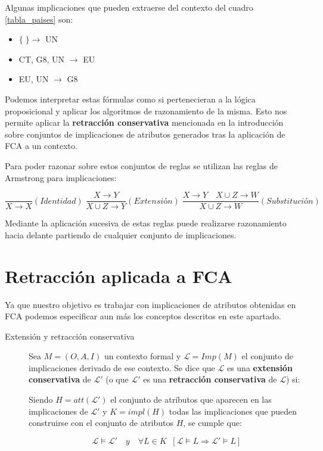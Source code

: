 	Algunas implicaciones que pueden extraerse del contexto del cuadro \ref{tabla_paises} son:
	
	\begin{itemize}
		\item $\{\;\} \rightarrow$ UN
		\item CT, G8, UN $\rightarrow$ EU
		\item EU, UN $\rightarrow$ G8 
	\end{itemize}

	 Podemos interpretar estas fórmulas como si pertenecieran a la lógica proposicional y aplicar los algoritmos de razonamiento de la misma. Esto nos permite aplicar la \textbf{retracción conservativa} mencionada en la introducción sobre conjuntos de implicaciones de atributos generados tras la aplicación de FCA a un contexto.
	 
	 Para poder razonar sobre estos conjuntos de reglas se utilizan las reglas de Armstrong  para implicaciones: 
	 
	 \[
	 	\frac{}{X \to X} (Identidad) \; \frac{X \to Y}{X \cup Z \to Y}(Extensión) \; \frac{X \to Y \quad X \cup Z \to W}{X \cup Z \to W}(Substitución)
	 \]
	
	Mediante la aplicación sucesiva de estas reglas puede realizarse razonamiento hacia delante partiendo de cualquier conjunto de implicaciones.
	
\section*{Retracción aplicada a FCA} 	

Ya que nuestro objetivo es trabajar con implicaciones de atributos obtenidas en FCA podemos especificar aun más los conceptos descritos en este apartado.

\begin{description}
	\item[Extensión y retracción conservativa] 
	Sea $M = (O,A,I)$ un contexto formal y $\mathcal{L} = Imp(M)$ el conjunto de implicaciones derivado de ese contexto. Se dice que $\mathcal{L}$ es una \textbf{extensión conservativa} de $\mathcal{L}'$ (o que $\mathcal{L}'$ es una \textbf{retracción conservativa} de $\mathcal{L}$) si:
	
	
	Siendo $H = att(\mathcal{L}')$ el conjunto de atributos que aparecen en las implicaciones de $\mathcal{L}'$ y $K = impl(H)$ todas las implicaciones que pueden construirse con el conjunto de atributos $H$, se cumple que: 
	
	
	\[ \mathcal{L} \models \mathcal{L}' \quad y \quad \forall L \in K \;\; [\mathcal{L} \models L \Longrightarrow \mathcal{L}' \models L]  \]

\end{description}

